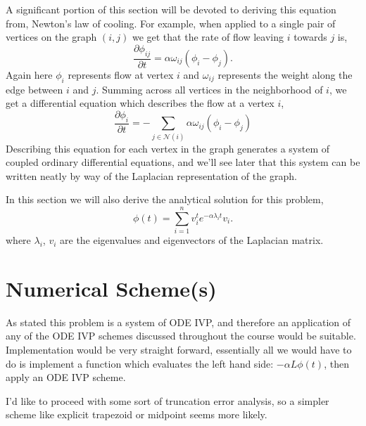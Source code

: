 \documentclass[11pt]{article}
\begin{document}
A significant portion of this section will be devoted to deriving this equation from, Newton's law of cooling.
For example, when applied to a single pair of vertices on the graph $(i, j)$ we get that the rate of flow leaving $i$ towards $j$ 
is,  
\begin{equation*}
    \dfrac{\partial \phi_{ij}}{\partial t} = \alpha \omega_{ij}(\phi_i - \phi_j).
\end{equation*}
Again here $\phi_i$ represents flow at vertex $i$ and $\omega_{ij}$ represents the weight along the edge between $i$ and $j$.
Summing across all vertices in the neighborhood of $i$, we get a differential equation which describes the flow at a vertex $i$, 
\begin{equation*}
    \dfrac{\partial \phi_{i}}{\partial t} = -\sum_{j \in \mathcal{N}(i)}\alpha \omega_{ij}(\phi_i - \phi_j)
\end{equation*}
Describing this equation for each vertex in the graph generates a system of coupled ordinary differential equations, and 
we'll see later that this system can be written neatly by way of the Laplacian representation of the graph. 

In this section we will also derive the analytical solution for this problem\cite{Zhukov}, 
\begin{equation*}
    \phi(t) = \sum_{i = 1}^nv_i^te^{-\alpha \lambda_i t}v_i.
\end{equation*}
where $\lambda_i$, $v_i$ are the eigenvalues and eigenvectors of the Laplacian matrix. 








\section{Numerical Scheme(s)} 
As stated this problem is a system of ODE IVP, and therefore an application of any of the ODE IVP schemes discussed 
throughout the course would be suitable. Implementation would be very straight forward, essentially all we would have to 
do is implement a function which evaluates the left hand side: $-\alpha L \phi(t)$, then apply an ODE IVP scheme. 

I'd like to proceed with some sort of truncation error analysis, so a simpler scheme
like explicit trapezoid or midpoint seems more likely. 
\end{document}
